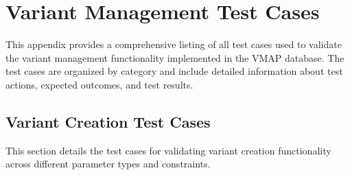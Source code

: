 \chapter{Variant Management Test Cases}
\label{appendix:variant-management-tests}

This appendix provides a comprehensive listing of all test cases used to validate the variant management functionality implemented in the VMAP database. The test cases are organized by category and include detailed information about test actions, expected outcomes, and test results.

\section{Variant Creation Test Cases}
\label{sec:variant-creation-tests}

This section details the test cases for validating variant creation functionality across different parameter types and constraints.

